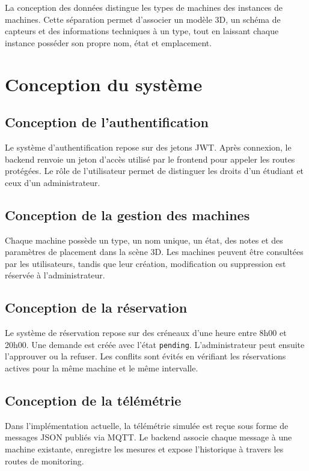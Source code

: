 La conception des données distingue les types de machines des instances de machines. Cette séparation permet d’associer un modèle 3D, un schéma de capteurs et des informations techniques à un type, tout en laissant chaque instance posséder son propre nom, état et emplacement.

\section{Conception du système}

\subsection{Conception de l’authentification}

Le système d’authentification repose sur des jetons JWT. Après connexion, le backend renvoie un jeton d’accès utilisé par le frontend pour appeler les routes protégées. Le rôle de l’utilisateur permet de distinguer les droits d’un étudiant et ceux d’un administrateur.

\subsection{Conception de la gestion des machines}

Chaque machine possède un type, un nom unique, un état, des notes et des paramètres de placement dans la scène 3D. Les machines peuvent être consultées par les utilisateurs, tandis que leur création, modification ou suppression est réservée à l’administrateur.

\subsection{Conception de la réservation}

Le système de réservation repose sur des créneaux d’une heure entre 8h00 et 20h00. Une demande est créée avec l’état \texttt{pending}. L’administrateur peut ensuite l’approuver ou la refuser. Les conflits sont évités en vérifiant les réservations actives pour la même machine et le même intervalle.

\subsection{Conception de la télémétrie}

Dans l’implémentation actuelle, la télémétrie simulée est reçue sous forme de messages JSON publiés via MQTT. Le backend associe chaque message à une machine existante, enregistre les mesures et expose l’historique à travers les routes de monitoring.

